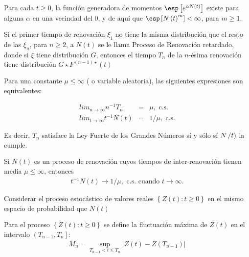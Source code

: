\begin{Prop}
Para cada $t\geq0$, la funci\'on generadora de momentos $\esp\left[e^{\alpha N\left(t\right)}\right]$ existe para alguna $\alpha$ en una vecindad del 0, y de aqu\'i que $\esp\left[N\left(t\right)^{m}\right]<\infty$, para $m\geq1$.
\end{Prop}


\begin{Note}
Si el primer tiempo de renovaci\'on $\xi_{1}$ no tiene la misma distribuci\'on que el resto de las $\xi_{n}$, para $n\geq2$, a $N\left(t\right)$ se le llama Proceso de Renovaci\'on retardado, donde si $\xi$ tiene distribuci\'on $G$, entonces el tiempo $T_{n}$ de la $n$-\'esima renovaci\'on tiene distribuci\'on $G\star F^{\left(n-1\right)\star}\left(t\right)$
\end{Note}


\begin{Teo}
Para una constante $\mu\leq\infty$ ( o variable aleatoria), las siguientes expresiones son equivalentes:

\begin{eqnarray}
lim_{n\rightarrow\infty}n^{-1}T_{n}&=&\mu,\textrm{ c.s.}\\
lim_{t\rightarrow\infty}t^{-1}N\left(t\right)&=&1/\mu,\textrm{ c.s.}
\end{eqnarray}
\end{Teo}


Es decir, $T_{n}$ satisface la Ley Fuerte de los Grandes N\'umeros s\'i y s\'olo s\'i $N\left/t\right)$ la cumple.


\begin{Coro}
Si $N\left(t\right)$ es un proceso de renovaci\'on cuyos tiempos de inter-renovaci\'on tienen media $\mu\leq\infty$, entonces
\begin{eqnarray}
t^{-1}N\left(t\right)\rightarrow 1/\mu,\textrm{ c.s. cuando }t\rightarrow\infty.
\end{eqnarray}

\end{Coro}


Considerar el proceso estoc\'astico de valores reales $\left\{Z\left(t\right):t\geq0\right\}$ en el mismo espacio de probabilidad que $N\left(t\right)$

\begin{Def}
Para el proceso $\left\{Z\left(t\right):t\geq0\right\}$ se define la fluctuaci\'on m\'axima de $Z\left(t\right)$ en el intervalo $\left(T_{n-1},T_{n}\right]$:
\begin{eqnarray*}
M_{n}=\sup_{T_{n-1}<t\leq T_{n}}|Z\left(t\right)-Z\left(T_{n-1}\right)|
\end{eqnarray*}
\end{Def}

